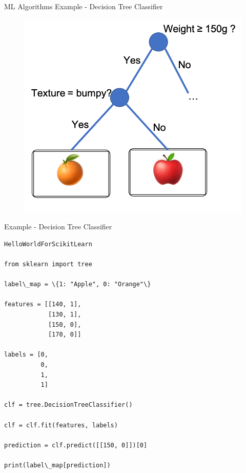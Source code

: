 \documentclass{beamer}
\begin{document}
\begin{frame}[allowframebreaks]{ML Algorithms}
\framebreak
{\large Example - Decision Tree Classifier}
\begin{figure}
\centering
\captionsetup{justification=centering}
\includegraphics[scale=0.45]{DecisionTree.png}
\end{figure}

\framebreak
{\large Example - Decision Tree Classifier}
\begin{lstlisting}
HelloWorldForScikitLearn

from sklearn import tree

label\_map = \{1: "Apple", 0: "Orange"\}

features = [[140, 1], 
            [130, 1], 
            [150, 0], 
            [170, 0]]

labels = [0,
          0,
          1,
          1]

clf = tree.DecisionTreeClassifier()

clf = clf.fit(features, labels)

prediction = clf.predict([[150, 0]])[0]

print(label\_map[prediction])
\end{lstlisting}

\framebreak

\end{frame}
\end{document}
